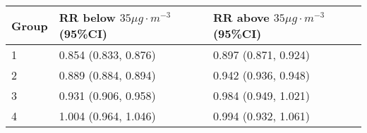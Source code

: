 \begin{tabular}{lll}
  \hline
Group & RR below $35 \mu g \cdot m^{-3}$ (95\%CI) & RR above $35 \mu g \cdot m^{-3}$ (95\%CI) \\ 
  \hline
   1 & 0.854 (0.833, 0.876) & 0.897 (0.871, 0.924) \\ 
     2 & 0.889 (0.884, 0.894) & 0.942 (0.936, 0.948) \\ 
     3 & 0.931 (0.906, 0.958) & 0.984 (0.949, 1.021) \\ 
     4 & 1.004 (0.964, 1.046) & 0.994 (0.932, 1.061) \\ 
   \hline
\end{tabular}

